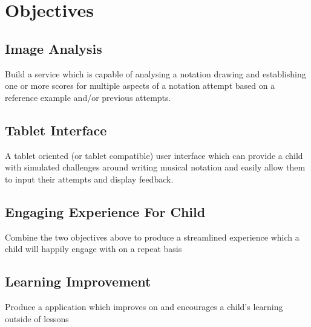 \section{Objectives}

\subsection*{Image Analysis}
Build a service which is capable of analysing a notation drawing and establishing one or more scores for multiple aspects of a notation attempt based on a reference example and/or previous attempts.

\subsection*{Tablet Interface}
A tablet oriented (or tablet compatible) user interface which can provide a child with simulated challenges around writing musical notation and easily allow them to input their attempts and display feedback.

\subsection*{Engaging Experience For Child}
Combine the two objectives above to produce a streamlined experience which a child will happily engage with on a repeat basis

\subsection*{Learning Improvement}
Produce a application which improves on and encourages a child's learning outside of lessons
